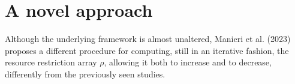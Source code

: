 \section{A novel approach} 
Although the underlying framework is almost unaltered, Manieri et al. (2023)\supercite{manieri} proposes a different procedure for computing, still in an iterative fashion, the resource restriction array $\rho$, allowing it both to increase and to decrease, differently from the previously seen studies.


